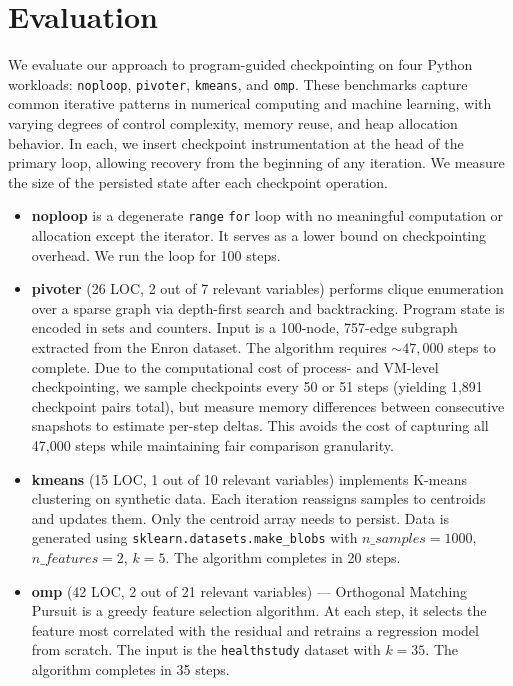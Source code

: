 \begin{figure*}
    \centering
    
\end{figure*}

\section{Evaluation}
\label{sec:evaluation}
We evaluate our approach to program-guided checkpointing on four Python workloads: \texttt{noploop}, \texttt{pivoter}, \texttt{kmeans}, and \texttt{omp}. These benchmarks capture common iterative patterns in numerical computing and machine learning, with varying degrees of control complexity, memory reuse, and heap allocation behavior. In each, we insert checkpoint instrumentation at the head of the primary loop, allowing recovery from the beginning of any iteration. We measure the size of the persisted state after each checkpoint operation.

\begin{itemize}
    \item \textbf{noploop} is a degenerate \texttt{range} \texttt{for} loop with no meaningful computation or allocation except the iterator. It serves as a lower bound on checkpointing overhead. We run the loop for 100 steps.

    \item \textbf{pivoter} (26 LOC, 2 out of 7 relevant variables) performs clique enumeration over a sparse graph via depth-first search and backtracking. Program state is encoded in sets and counters. Input is a 100-node, 757-edge subgraph extracted from the Enron dataset. The algorithm requires $\sim 47,000$ steps to complete. Due to the computational cost of process- and VM-level checkpointing, we sample checkpoints every 50 or 51 steps (yielding 1,891 checkpoint pairs total), but measure memory differences between consecutive snapshots to estimate per-step deltas. This avoids the cost of capturing all 47,000 steps while maintaining fair comparison granularity.

    \item \textbf{kmeans} (15 LOC, 1 out of 10 relevant variables) implements K-means clustering on synthetic data. Each iteration reassigns samples to centroids and updates them. Only the centroid array needs to persist. Data is generated using \texttt{sklearn.datasets.make\_blobs} with $n\_samples=1000$, $n\_features=2$, $k=5$. The algorithm completes in 20 steps.

    \item \textbf{omp} (42 LOC, 2 out of 21 relevant variables) --- Orthogonal Matching Pursuit is a greedy feature selection algorithm. At each step, it selects the feature most correlated with the residual and retrains a regression model from scratch. The input is the \texttt{healthstudy} dataset with $k = 35$. The algorithm completes in 35 steps.
\end{itemize}

